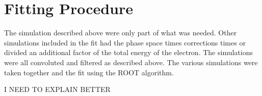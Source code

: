 \section{Fitting Procedure}
The simulation described above were only part of what was needed.
Other simulations included in the fit had the phase space times corrections times or divided an additional factor of the total energy of the electron.
The simulations were all convoluted and filtered as described above.
The various simulations were taken together and the fit using the ROOT algorithm.

I NEED TO EXPLAIN BETTER
